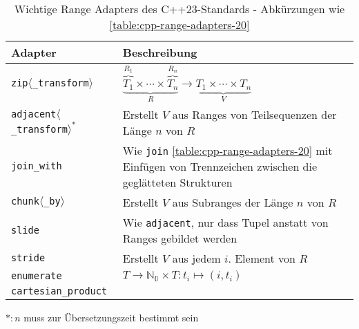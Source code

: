 \documentclass{scrarticle}
\begin{document}
\begin{table}
	\caption{Wichtige Range Adapters des C++23-Standards - Abkürzungen wie \ref{table:cpp-range-adapters-20}}
	\label{table:cpp-range-adapters-23}
	\hspace{-4em}
	\begin{tabular}{l|l}
		\hline
		Adapter & Beschreibung \\
		\hline
		\texttt{zip$\langle$\_transform$\rangle$} & $\underbrace{\overbrace{T_1}^{R_1}\times\cdots\times\overbrace{T_n}^{R_n}}_{R}\to \underbrace{T_1\times\cdots\times T_n}_{V}$ \\
		\texttt{adjacent$\langle$\_transform$\rangle^\ast$} & Erstellt $V$ aus Ranges von Teilsequenzen der Länge $n$ von $R$ \\
		\texttt{join\_with} & Wie \texttt{join} \ref{table:cpp-range-adapters-20} mit Einfügen von Trennzeichen zwischen die geglätteten Strukturen \\
		\texttt{chunk$\langle$\_by$\rangle$} & Erstellt $V$ aus Subranges der Länge $n$ von $R$ \\
		\texttt{slide} & Wie \texttt{adjacent}, nur dass Tupel anstatt von Ranges gebildet werden \\
		\texttt{stride} & Erstellt $V$ aus jedem $i.$ Element von $R$ \\
		\texttt{enumerate} & $T\to\mathbb{N_0}\times T:t_i\mapsto(i,t_i)$ \\
		\texttt{cartesian\_product} & \\
	\end{tabular}
	$\ast:n$ muss zur Übersetzungszeit bestimmt sein
\end{table}
\end{document}
